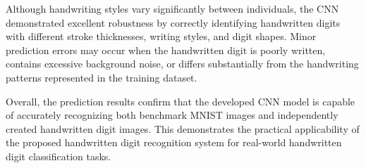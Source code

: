 Although handwriting styles vary significantly between individuals, the CNN demonstrated excellent robustness by correctly identifying handwritten digits with different stroke thicknesses, writing styles, and digit shapes. Minor prediction errors may occur when the handwritten digit is poorly written, contains excessive background noise, or differs substantially from the handwriting patterns represented in the training dataset.

Overall, the prediction results confirm that the developed CNN model is capable of accurately recognizing both benchmark MNIST images and independently created handwritten digit images. This demonstrates the practical applicability of the proposed handwritten digit recognition system for real-world handwritten digit classification tasks.